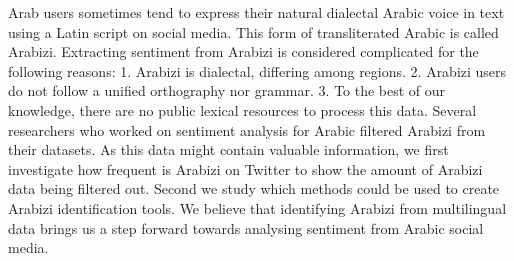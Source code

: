 Arab users sometimes tend to express their natural dialectal Arabic voice in text using a Latin script on social media. This form of transliterated Arabic is called Arabizi. Extracting sentiment from Arabizi is considered complicated for the following reasons: 1. Arabizi is dialectal, differing among regions. 2. Arabizi users do not follow a unified orthography nor grammar. 3. To the best of our knowledge, there are no public lexical resources to process this data. Several researchers who worked on sentiment analysis for Arabic filtered Arabizi from their datasets. As this data might contain valuable information, we first investigate how frequent is Arabizi on Twitter to show the amount of Arabizi data being filtered out. Second we study which methods could be used to create Arabizi identification tools. We believe that identifying Arabizi from multilingual data brings us a step forward towards  analysing sentiment from Arabic social media.

